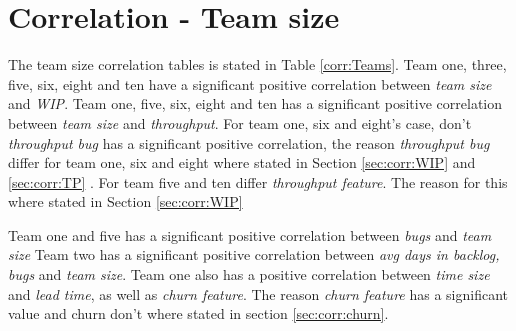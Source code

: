 \documentclass[UKenglish]{ifimaster}  %
\begin{document}
 
 \section{Correlation - Team size}
 The team size correlation tables is stated in Table \ref{corr:Teams}. Team one, three, five, six, eight and ten have a significant positive correlation between \textit{team size} and  \textit{WIP}. Team one, five, six, eight and ten has a significant positive correlation between \textit{team size} and \textit{throughput}. For team one, six and eight's case, don't \textit{throughput bug} has a significant positive correlation, the reason \textit{throughput bug} differ for team one, six and eight where stated in Section \ref{sec:corr:WIP} and \ref{sec:corr:TP} . For team five and ten differ \textit{throughput feature}. The reason for this where stated in Section \ref{sec:corr:WIP}
 
Team one and five has a significant positive correlation between \textit{bugs} and \textit{team size} Team two has a significant positive correlation between \textit{avg days in backlog, bugs} and \textit{team size}. Team one also has a positive correlation between \textit{time size} and \textit{lead time},  as well as \textit{churn feature}. The reason \textit{churn feature} has a significant value and churn don't where stated in section \ref{sec:corr:churn}. 
\end{document}
